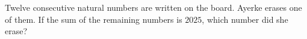 Twelve consecutive natural numbers are written on the board. Ayerke erases one of them. If the sum of the remaining numbers is $2025$, which number did she erase?
